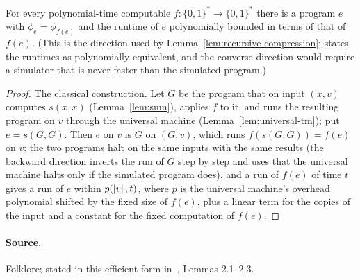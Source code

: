 \begin{lemma}
\label{lem:kleene}
\leanok
For every polynomial-time computable $f : \{0,1\}^* \to \{0,1\}^*$ there is a program
$e$ with $\phi_e = \phi_{f(e)}$ and the runtime of $e$ polynomially bounded in terms
of that of $f(e)$. (This is the direction used by Lemma~\ref{lem:recursive-compression};
\cite{MNY} states the runtimes as polynomially equivalent, and the converse direction
would require a simulator that is never faster than the simulated program.)
\end{lemma}

\begin{proof}
\leanok
The classical construction. Let $G$ be the program that on input $(x, v)$ computes
$s(x, x)$ (Lemma~\ref{lem:smn}), applies $f$ to it, and runs the resulting program on $v$
through the universal machine (Lemma~\ref{lem:universal-tm}); put $e = s(G, G)$. Then $e$
on $v$ is $G$ on $(G, v)$, which runs $f(s(G, G)) = f(e)$ on $v$: the two programs halt
on the same inputs with the same results (the backward direction inverts the run of $G$
step by step and uses that the universal machine halts only if the simulated program
does), and a run of $f(e)$ of time $t$ gives a run of $e$ within $p(\left\vert {v} \right\vert, t)$, where
$p$ is the universal machine's overhead polynomial shifted by the fixed size of $f(e)$,
plus a linear term for the copies of the input and a constant for the fixed computation
of $f(e)$.
\end{proof}

\paragraph{Source.} Folklore; stated in this efficient form in~\cite{MNY}, Lemmas
2.1--2.3.

